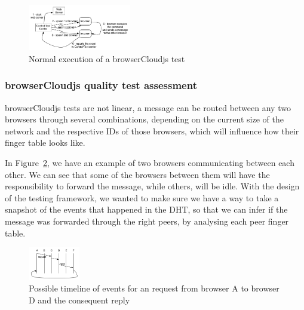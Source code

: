 \begin{figure}[h!]
  \centering
  \includegraphics[width=0.4\textwidth]{figs/testing-framework-1}
  \caption{Normal execution of a browserCloudjs test}
  \label{fig:t-f-1}
\end{figure}

\subsubsection{browserCloudjs quality test assessment}

browserCloudjs tests are not linear, a message can be routed between any two browsers through several combinations, depending on the current size of the network and the respective IDs of those browsers, which will influence how their finger table looks like.

In Figure~\ref{fig:t-f-2}, we have an example of two browsers communicating between each other. We can see that some of the browsers between them will have the responsibility to forward the message, while others, will be idle. With the design of the testing framework, we wanted to make sure we have a way to take a snapshot of the events that happened in the DHT, so that we can infer if the message was forwarded through the right peers, by analysing each peer finger table.

\begin{figure}[h!]
  \centering
  \includegraphics[width=0.2\textwidth]{figs/testing-framework-2}
  \caption{Possible timeline of events for an request from browser A to browser D and the consequent reply}
  \label{fig:t-f-2}
\end{figure}

